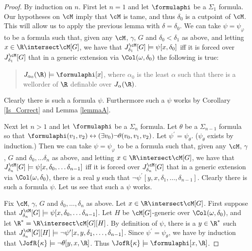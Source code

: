 \begin{proof}
By induction on $n$. First let $n=1$ and let $\formulaphi$ be a
$\Sigma_1$ formula. Our hypotheses on $\cM$  imply that $\cM$ is tame,
and thus  $\delta_0$ is a cutpoint of $\cM$. This will allow us to apply
the previous lemma with $\delta=\delta_0$.
We can take $\psi=\psi_{\varphi}$ to be a
formula such that, given any $\cM$, $\gamma$,  $G$ and
$\delta_0<\delta_1$ as above, and
letting $x\in\R\intersect\cM[G]$,  we have
that $J_{\delta_1}^{\cM}[G]\models\psi[x,\delta_0]$ iff
it is forced over $J_{\delta_1}^{\cM}[G]$ that in a generic extension
via $\Col(\omega,\delta_0)$ the following is true:
\begin{quote}
$J_{\alpha_0}(\R)\models\formulaphi[x]$, where $\alpha_0$ is the least
$\alpha$ such that there is a wellorder of $\R$ definable
over $J_{\alpha}(\R)$.
\end{quote}
Clearly there is such a formula $\psi$.
Furthermore
such a $\psi$ works by  Corollary
\ref{Is_Correct} and Lemma \ref{lemmaA}.


Next let $n>1$ and let $\formulaphi$ be a $\Sigma_n$ formula. Let $\theta$
be a $\Sigma_{n-1}$ formula  so that
$\formulaphi(v_1,v_2) \leftrightarrow (\exists v_0)
\neg\theta(v_0,v_1,v_2)$. Let $\psi^{\prime}=\psi_{\theta}$.
($\psi_{\theta}$ exists by induction.)
Then we can
take $\psi=\psi_{\varphi}$ to be a formula such that, given any
$\cM$, $\gamma$, $G$ and $\delta_0, \dots \delta_n$
 as above, and letting $x\in\R\intersect\cM[G]$,
we have that
$J_{\delta_n}^{\cM}[G]\models\psi[x,\delta_0,\dots\delta_{n-1}]$
iff it is forced over $J_{\delta_n}^{\cM}[G]$ that in a generic
extension via $\Col(\omega,\delta_0)$, there is a real $y$ such
that $\neg\psi^{\prime}[y,x,\delta_1,\dots,\delta_{n-1}]$. Clearly
 there is such a formula $\psi$. Let us see that such
a $\psi$ works.

Fix $\cM$, $\gamma$, $G$ and $\delta_0,\dots,\delta_n$ as above.
Let $x\in\R\intersect\cM[G]$. First suppose
that $J_{\delta_n}^{\cM}[G]\models
\psi[x,\delta_0,\dots\delta_{n-1}]$. Let $H$ be $\cM[G]$-generic
over $\Col(\omega,\delta_0)$, and let
$\R^{*}=\R\intersect\cM[G][H]$. By definition of $\psi$, there is
a $y\in\R^{*}$ such that
$J_{\delta_n}^{\cM}[G][H]\models
\neg\psi^{\prime}[x,y,\delta_1,\dots,\delta_{n-1}]$. Since
$\psi^{\prime}=\psi_{\theta}$, we have by induction that
$\JofR{\kappa}\models\neg\theta[y,x,\R]$.
Thus $\JofR{\kappa}\models\formulaphi[x,\R]$.


\end{proof}
